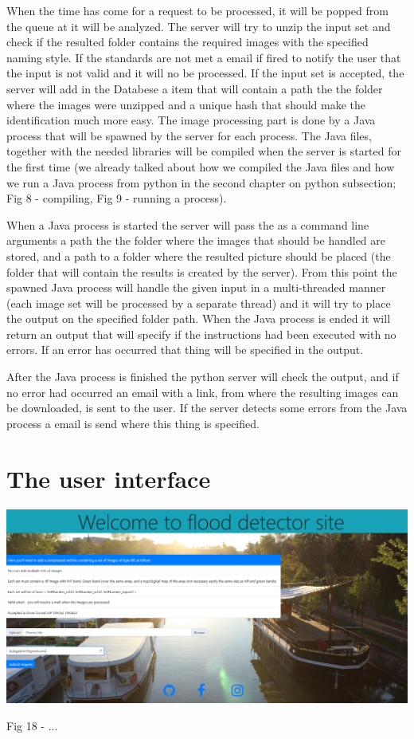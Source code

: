 \documentclass[12pt, a4paper]{report}
\begin{document}
When the time has come for a request to be processed, it will be popped from the queue at it will be analyzed. The server will try to unzip the input set and check if the resulted folder contains the required images with the specified naming style. If the standards are not met a email if fired to notify the user that the input is not valid and it will no be processed. If the input set is accepted, the server will add in the Databese a item that will contain a path the the folder where the images were unzipped and a unique hash that should make the identification much more easy. The image processing part is done by a Java process that will be spawned by the server for each process. The Java files, together with the needed libraries will be compiled when the server is started for the first time (we already talked about how we compiled the Java files and how we run a Java process from python in the second chapter on python subsection; Fig 8 - compiling, Fig 9 - running a process). 
\par 

When a Java process is started the server will pass the as a command line arguments a path the the folder where the images that should be handled are stored, and a path to a folder where the resulted picture should be placed (the folder that will contain the results is created by the server). From this point the spawned Java process will handle the given input in a multi-threaded manner (each image set will be processed by a separate thread) and it will try to place the output on the specified folder path. When the Java process is ended it will return an output that will specify if the instructions had been executed with no errors. If an error has occurred that thing will be specified in the output. 
\par 

After the Java process is finished the python server will check the output, and if no error had occurred an email with a link, from where the resulting images can be downloaded, is sent to the user. If the server detects some errors from the Java process a email is send where this thing is specified.
\section{The user interface}

\medskip
\includegraphics[scale=0.3, center]{gui_homepage.png}
\begin{center}
Fig 18 - ... 
\end{center}
\par 
\end{document}
